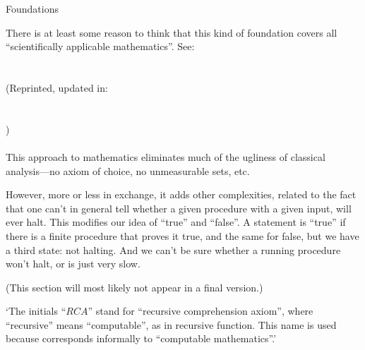 \documentclass[12pt]{PalisadesLakesBook}
\begin{document}
\begin{plSection}{Foundations}
\begin{itemize}
There is at least some reason to think 
that this kind of foundation covers all ``scientifically
applicable mathematics''.
See:\\
\\
\\
(Reprinted, updated in:\\
\\
\\
)\\
\\

This approach to mathematics eliminates much of the ugliness
of classical analysis---no axiom of choice, no unmeasurable
sets, etc.

However, more or less in exchange, it adds other complexities,
related to the fact that one can't in general tell whether a given
procedure with a given input, will ever halt.
This modifies our idea of ``true'' and ``false''.
A statement is ``true'' if there is a finite procedure that
proves it true, and the same for false,
but we have a third state: not halting. 
And we can't be sure whether a running procedure won't halt,
or is just very slow.

\end{itemize}

\begin{plSection}{}

(This section will most likely not appear in a final version.)

  `The initials ``${RCA}$'' stand for ``recursive comprehension axiom'',
  where ``recursive'' means ``computable'',
  as in recursive function.
  This name is used because 
  corresponds informally to ``computable mathematics''.'~\cite{wiki:ReverseMathematics}


\end{plSection}
\end{plSection}
\end{document}

